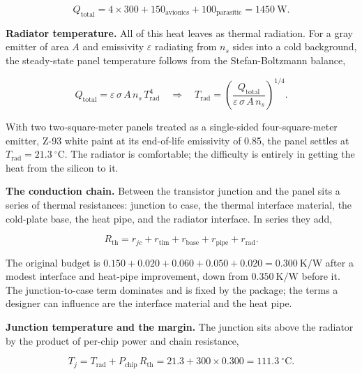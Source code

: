 \documentclass[
  11pt,
  openany,
  oneside]{book}
\begin{document}
\begin{equation}
Q_{\mathrm{total}} = 4 \times 300 + 150_{\mathrm{avionics}} + 100_{\mathrm{parasitic}} = 1450\ \mathrm{W}. \tag{2A.1}
\end{equation}

\textbf{Radiator temperature.} All of this heat leaves as thermal
radiation. For a gray emitter of area \(A\) and emissivity
\(\varepsilon\) radiating from \(n_s\) sides into a cold background, the
steady-state panel temperature follows from the Stefan-Boltzmann
balance,

\begin{equation}
Q_{\mathrm{total}} = \varepsilon\,\sigma\, A\, n_s\, T_{\mathrm{rad}}^4
\quad\Longrightarrow\quad
T_{\mathrm{rad}} = \left(\frac{Q_{\mathrm{total}}}{\varepsilon\,\sigma\,A\,n_s}\right)^{1/4}. \tag{2A.2}
\end{equation}

With two two-square-meter panels treated as a single-sided
four-square-meter emitter, Z-93 white paint at its end-of-life
emissivity of 0.85, the panel settles at
\(T_{\mathrm{rad}} = 21.3\ ^\circ\mathrm{C}\). The radiator is
comfortable; the difficulty is entirely in getting the heat from the
silicon to it.

\textbf{The conduction chain.} Between the transistor junction and the
panel sits a series of thermal resistances: junction to case, the
thermal interface material, the cold-plate base, the heat pipe, and the
radiator interface. In series they add,

\begin{equation}
R_{\mathrm{th}} = r_{jc} + r_{\mathrm{tim}} + r_{\mathrm{base}} + r_{\mathrm{pipe}} + r_{\mathrm{rad}}. \tag{2A.3}
\end{equation}

The original budget is
\(0.150 + 0.020 + 0.060 + 0.050 + 0.020 = 0.300\ \mathrm{K/W}\) after a
modest interface and heat-pipe improvement, down from
\(0.350\ \mathrm{K/W}\) before it. The junction-to-case term dominates
and is fixed by the package; the terms a designer can influence are the
interface material and the heat pipe.

\textbf{Junction temperature and the margin.} The junction sits above
the radiator by the product of per-chip power and chain resistance,

\begin{equation}
T_j = T_{\mathrm{rad}} + P_{\mathrm{chip}}\, R_{\mathrm{th}}
      = 21.3 + 300 \times 0.300 = 111.3\ ^\circ\mathrm{C}. \tag{2A.4}
\end{equation}
\end{document}
